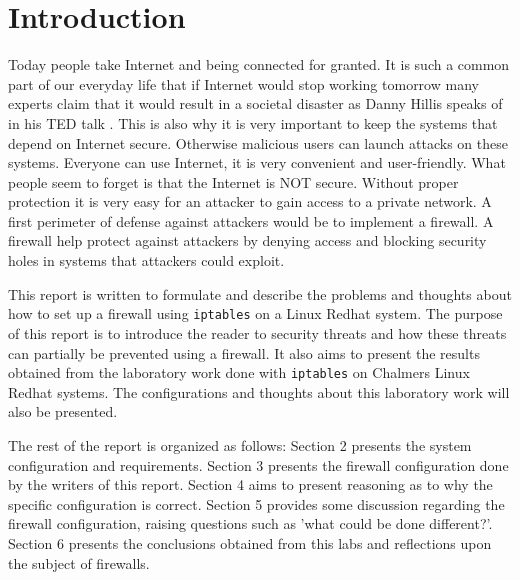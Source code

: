 \section{Introduction} 
\label{sec:intro}
Today people take Internet and being connected for granted. It is such a common part of our everyday life that if Internet would stop working tomorrow many experts claim that it would result in a societal disaster as Danny Hillis speaks of in his TED talk \cite{hillis13}. This is also why it is very important to keep the systems that depend on Internet secure. Otherwise malicious users can launch attacks on these systems. Everyone can use Internet, it is very convenient and user-friendly. What people seem to forget is that the Internet is NOT secure. Without proper protection it is very easy for an attacker to gain access to a private network. A first perimeter of defense against attackers would be to implement a firewall. A firewall help protect against attackers by denying access and blocking security holes in systems that attackers could exploit.

This report is written to formulate and describe the problems and thoughts about how to set up a firewall using \verb;iptables; on a Linux Redhat system. The purpose of this report is to introduce the reader to security threats and how these threats can partially be prevented using a firewall. It also aims to present the results obtained from the laboratory work done with \verb;iptables; on Chalmers Linux Redhat systems. The configurations and thoughts about this laboratory work will also be presented.

The rest of the report is organized as follows: Section 2 presents the system configuration and requirements. Section 3 presents the firewall configuration done by the writers of this report. Section 4 aims to present reasoning as to why the specific configuration is correct. Section 5 provides some discussion regarding the firewall configuration, raising questions such as 'what could be done different?'. Section 6 presents the conclusions obtained from this labs and reflections upon the subject of firewalls.
